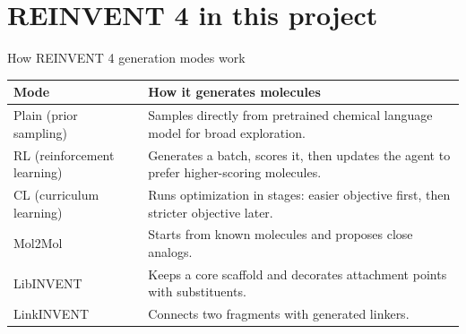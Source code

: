 \documentclass[aspectratio=169,10pt]{beamer}
\begin{document}
\section{REINVENT 4 in this project}

\begin{frame}{How REINVENT 4 generation modes work}
  \small
  \begin{tabularx}{\textwidth}{lX}
    \toprule
    \textbf{Mode} & \textbf{How it generates molecules} \\
    \midrule
    Plain (prior sampling) & Samples directly from pretrained chemical language model for broad exploration. \\
    RL (reinforcement learning) & Generates a batch, scores it, then updates the agent to prefer higher-scoring molecules. \\
    CL (curriculum learning) & Runs optimization in stages: easier objective first, then stricter objective later. \\
    Mol2Mol & Starts from known molecules and proposes close analogs. \\
    LibINVENT & Keeps a core scaffold and decorates attachment points with substituents. \\
    LinkINVENT & Connects two fragments with generated linkers. \\
    \bottomrule
  \end{tabularx}
\end{frame}
\end{document}
